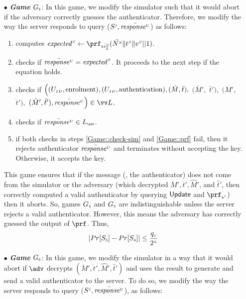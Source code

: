 \begin{itemize}
\item[$\bullet$] \textit{\textbf{Game}}  $G_{\scriptscriptstyle  5}$: In this game, we modify the simulator such that it would abort if
the adversary correctly guesses the authenticator. Therefore, we modify the way the server responds to  query {\send($S^{\scriptscriptstyle  j},   \bar{\mathit{response}^{\scriptscriptstyle U}}$)} as follows: 

\begin{enumerate}
%
\item computes $\VS{\mathit{expected}} \gets \prf_{\sss\bar{\VS{\keyt_{\sss3}}}}(\ddot{\VS{\nonce}}  \| \VS{\trans} \| \VS{\verifier}|| 1)$.
%
\item checks if $\bar{\mathit{response}^{\scriptscriptstyle U}}=\mathit{expected}^{\scriptscriptstyle S}$. It proceeds to the next step if the equation holds. 
%
\item\label{Game::check-sim} checks if $\Big((U_{\scriptscriptstyle  ID},  \text{enrolment}), (U_{\scriptscriptstyle  ID},  \text{authentication}), (\bar M, \bar t),$ $ (\bar M',$ $ \bar t'),$ $ (\ddot M', $ $\ddot t'), $ $(\hat M', \hat t'), \bar{\VC{\mathit{response}}}\Big)\in \vv L$.

\item\label{Game::prf} checks if $ \bar{\VC{\mathit{response}}}\in L_{\sss \adv}$. 
%
\item if both checks in steps \ref{Game::check-sim} and \ref{Game::prf} fail, then it rejects authenticator $\bar{\mathit{response}^{\scriptscriptstyle U}}$ and terminates without accepting the key. Otherwise, it accepts the key. 
%
\end{enumerate}
This game ensures that if the message (\ie, the authenticator) does not come from the simulator or the adversary (which decrypted $\ddot M',\ddot t', \hat M'$, and  $\hat t'$, then correctly computed a valid authenticator by querying $\mathsf{Update}$ and $\prf_{\sss  k'}$) then it aborts. So, games $G_{\scriptscriptstyle  4}$ and $G_{\scriptscriptstyle  5}$ are indistinguishable unless the server rejects a valid authenticator. However, this means the adversary has correctly guessed the output of $\prf$. Thus, 
%
\begin{equation}\label{eq::game_5}
|Pr[S_{\scriptscriptstyle  5}]-Pr[S_{\scriptscriptstyle  4}]|\leq \frac{q_{\scriptscriptstyle  s}}{2^{\scriptscriptstyle \lambda}}
\end{equation}



\item[$\bullet$] \textit{\textbf{Game}}  $G_{\scriptscriptstyle  6}$: 
 In this game, we modify the simulator in a way that it would abort if $\adv$ decrypts $ (\ddot M', \ddot t', \hat M', \hat t')$ and uses the result to generate and send a valid authenticator to the server. To do so, we modify the way the server responds to  query {\send($S^{\scriptscriptstyle  j},   \bar{\mathit{response}^{\scriptscriptstyle U}}$)}, as follows: 


\end{itemize}
